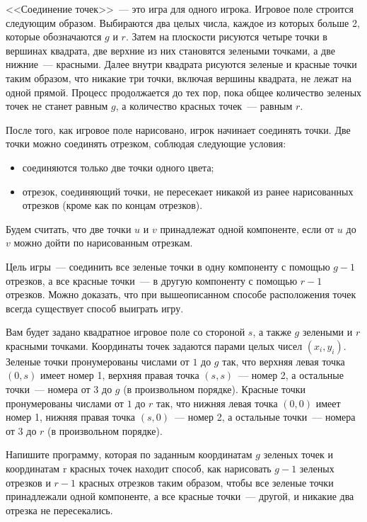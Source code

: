 <<Соединение точек>>~--- это игра для одного игрока. Игровое поле строится следующим
образом. Выбираются два целых числа, каждое из которых больше 2, которые обозначаются
$g$ и $r$. Затем на плоскости рисуются четыре точки в вершинах квадрата, две верхние из них становятся зелеными точками, а две нижние~--- красными. Далее внутри квадрата рисуются зеленые и красные точки таким образом, что никакие три точки, включая вершины квадрата, не лежат на одной прямой. Процесс продолжается до тех пор, пока общее количество зеленых точек не станет равным $g$, а количество красных точек~--- равным $r$.

После того, как игровое поле нарисовано, игрок начинает соединять точки. Две точки можно соединять отрезком, соблюдая следующие условия:
\begin{itemize}
\item соединяются только две точки одного цвета;
\item отрезок, соединяющий точки, не пересекает никакой из ранее нарисованных отрезков
(кроме как по концам отрезков).
\end{itemize}

Будем считать, что две точки $u$ и $v$ принадлежат одной компоненте, если от $u$ до $v$ можно дойти по нарисованным отрезкам.

Цель игры~--- соединить все зеленые точки в одну компоненту с помощью $g - 1$ отрезков, а все красные точки~--- в другую компоненту с помощью $r - 1$ отрезков. Можно доказать, что при вышеописанном способе расположения точек всегда существует способ выиграть игру. 

Вам будет задано квадратное игровое поле со стороной $s$, а также $g$ зелеными и $r$ красными точками. Координаты точек задаются парами целых чисел $(x_i, y_i)$. Зеленые точки пронумерованы числами от $1$ до $g$ так, что верхняя левая точка $(0, s)$ имеет номер 1, верхняя правая точка $(s, s)$~--- номер 2, а остальные точки~--- номера от $3$ до $g$ (в произвольном порядке). Красные точки пронумерованы числами от $1$ до $r$ так, что нижняя левая точка $(0, 0)$ имеет номер 1, нижняя правая точка $(s, 0)$~--- номер 2, а остальные точки~--- номера от $3$ до $r$ (в произвольном порядке).

Напишите программу, которая по заданным координатам $g$ зеленых точек и координатам r
красных точек находит способ, как нарисовать $g - 1$ зеленых отрезков и $r - 1$ красных отрезков таким образом, чтобы все зеленые точки принадлежали одной компоненте, а все красные точки~--- другой, и никакие два отрезка не пересекались.

